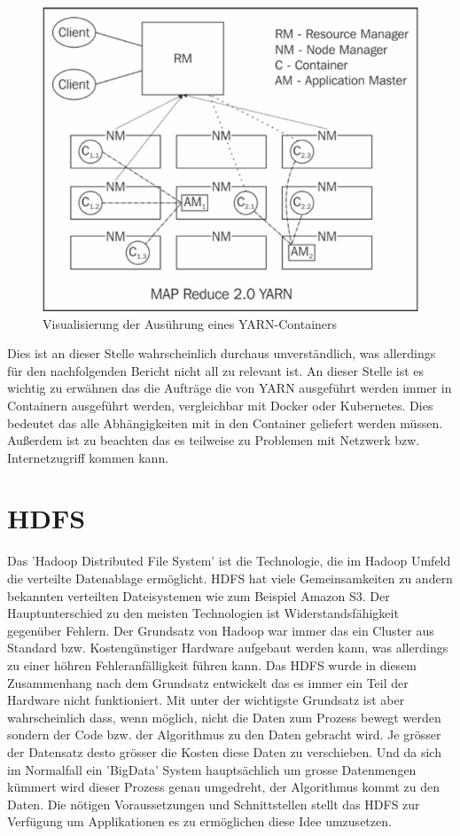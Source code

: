 \documentclass[12pt,oneside,a4paper,parskip]{scrbook}
\begin{document}
\begin{figure}[H]
	\centering
	\includegraphics[scale=0.9]{yarnOverview.png}
	\captionsetup{justification=centering}
	\caption{Visualisierung der Aus\"uhrung eines YARN-Containers}
	\label{pic:yarnOverview}
\end{figure}
Dies ist an dieser Stelle wahrscheinlich durchaus unverst\"andlich, was allerdings f\"ur den nachfolgenden Bericht nicht all zu relevant ist.
\newline An dieser Stelle ist es wichtig zu erw\"ahnen das die Auftr\"age die von YARN ausgef\"uhrt werden immer in Containern ausgef\"uhrt werden, vergleichbar mit Docker oder Kubernetes. Dies bedeutet das alle Abh\"angigkeiten mit in den Container geliefert werden m\"ussen. Außerdem ist zu beachten das es teilweise zu Problemen mit Netzwerk bzw. Internetzugriff kommen kann.
\section{HDFS}
Das 'Hadoop Distributed File System' ist die Technologie, die im Hadoop Umfeld die verteilte Datenablage erm\"oglicht. HDFS hat viele Gemeinsamkeiten zu andern bekannten verteilten Dateisystemen wie zum Beispiel Amazon S3. Der Hauptunterschied zu den meisten Technologien ist Widerstandsf\"ahigkeit gegen\"uber Fehlern. Der Grundsatz von Hadoop war immer das ein Cluster aus Standard bzw. Kosteng\"unstiger Hardware aufgebaut werden kann, was allerdings zu einer h\"ohren Fehleranf\"alligkeit f\"uhren kann. Das HDFS wurde in diesem Zusammenhang nach dem Grundsatz entwickelt das es immer ein Teil der Hardware nicht funktioniert.\cite{hdfsFailure} \newline
Mit unter der wichtigste Grundsatz ist aber wahrscheinlich dass, wenn m\"oglich, nicht die Daten zum Prozess bewegt werden sondern der Code bzw. der Algorithmus zu den Daten gebracht wird.\cite{movingComputation} Je gr\"osser der Datensatz desto gr\"osser die Kosten diese Daten zu verschieben. Und da sich im Normalfall ein 'BigData' System haupts\"achlich um grosse Datenmengen k\"ummert wird dieser Prozess genau umgedreht, der Algorithmus kommt zu den Daten. Die n\"otigen Voraussetzungen und Schnittstellen stellt das HDFS zur Verf\"ugung um Applikationen es zu erm\"oglichen diese Idee umzusetzen.
\end{document}
